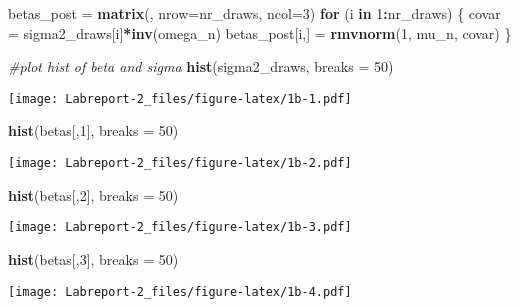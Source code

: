 \documentclass[]{article}
\newenvironment{Shaded}{\begin{snugshade}}{\end{snugshade}}
\newcommand{\CommentTok}[1]{\textcolor[rgb]{0.56,0.35,0.01}{\textit{#1}}}
\newcommand{\ControlFlowTok}[1]{\textcolor[rgb]{0.13,0.29,0.53}{\textbf{#1}}}
\newcommand{\DataTypeTok}[1]{\textcolor[rgb]{0.13,0.29,0.53}{#1}}
\newcommand{\DecValTok}[1]{\textcolor[rgb]{0.00,0.00,0.81}{#1}}
\newcommand{\KeywordTok}[1]{\textcolor[rgb]{0.13,0.29,0.53}{\textbf{#1}}}
\newcommand{\NormalTok}[1]{#1}
\newcommand{\OperatorTok}[1]{\textcolor[rgb]{0.81,0.36,0.00}{\textbf{#1}}}
\newcommand{\StringTok}[1]{\textcolor[rgb]{0.31,0.60,0.02}{#1}}
\begin{document}
\begin{Shaded}
\begin{Highlighting}[]
\NormalTok{betas_post =}\StringTok{ }\KeywordTok{matrix}\NormalTok{(, }\DataTypeTok{nrow=}\NormalTok{nr_draws, }\DataTypeTok{ncol=}\DecValTok{3}\NormalTok{)}
\ControlFlowTok{for}\NormalTok{ (i }\ControlFlowTok{in} \DecValTok{1}\OperatorTok{:}\NormalTok{nr_draws) \{}
\NormalTok{  covar =}\StringTok{ }\NormalTok{sigma2_draws[i]}\OperatorTok{*}\KeywordTok{inv}\NormalTok{(omega_n)}
\NormalTok{  betas_post[i,] =}\StringTok{ }\KeywordTok{rmvnorm}\NormalTok{(}\DecValTok{1}\NormalTok{, mu_n, covar)}
\NormalTok{\}}

\CommentTok{#plot hist of beta and sigma}
\KeywordTok{hist}\NormalTok{(sigma2_draws, }\DataTypeTok{breaks =} \DecValTok{50}\NormalTok{)}
\end{Highlighting}
\end{Shaded}

\texttt{[image: Labreport-2\_files/figure-latex/1b-1.pdf]}

\begin{Shaded}
\begin{Highlighting}[]
\KeywordTok{hist}\NormalTok{(betas[,}\DecValTok{1}\NormalTok{], }\DataTypeTok{breaks =} \DecValTok{50}\NormalTok{)}
\end{Highlighting}
\end{Shaded}

\texttt{[image: Labreport-2\_files/figure-latex/1b-2.pdf]}

\begin{Shaded}
\begin{Highlighting}[]
\KeywordTok{hist}\NormalTok{(betas[,}\DecValTok{2}\NormalTok{], }\DataTypeTok{breaks =} \DecValTok{50}\NormalTok{)}
\end{Highlighting}
\end{Shaded}

\texttt{[image: Labreport-2\_files/figure-latex/1b-3.pdf]}

\begin{Shaded}
\begin{Highlighting}[]
\KeywordTok{hist}\NormalTok{(betas[,}\DecValTok{3}\NormalTok{], }\DataTypeTok{breaks =} \DecValTok{50}\NormalTok{)}
\end{Highlighting}
\end{Shaded}

\texttt{[image: Labreport-2\_files/figure-latex/1b-4.pdf]}
\end{document}

